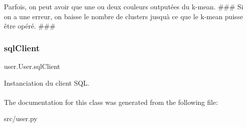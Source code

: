 Parfois, on peut avoir que une ou deux couleurs outputées du k-\/mean. \#\#\# Si on a une erreur, on baisse le nombre de clusters jusqu\textquotesingle{}à ce que le k-\/mean puisse être opéré. \#\#\# \mbox{\label{classuser_1_1_user_adf4a399faa3ea66427ecf7cb8a1bbb89}} 
\subsubsection{\texorpdfstring{sql\+Client}{sqlClient}}
{\footnotesize\ttfamily user.\+User.\+sql\+Client}



Instanciation du client S\+QL. 

\paragraph*{}

The documentation for this class was generated from the following file\+:\begin{DoxyCompactItemize}
\item 
src/user.\+py\end{DoxyCompactItemize}
